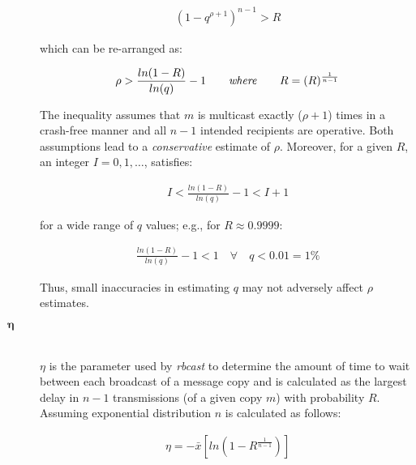 \begin{description}
		\begin{equation*}
		    \begin{aligned}
		        (1-q^{\rho+1})^{n-1} > R
		    \end{aligned}
		\end{equation*}

        which can be re-arranged as:

        \begin{equation*}
		    \begin{aligned}
		        \rho > \frac{ln(1-R)}{ln(q)} -1 \qquad \mbox{\emph{where}} \qquad R=(R)^{\frac{1}{n-1}}
		    \end{aligned}
		\end{equation*}

        The inequality assumes that $m$ is multicast exactly ($\rho +1$) times in a crash-free manner and all $n-1$  intended recipients are operative. Both assumptions lead to a \emph{conservative} estimate of $\rho$. Moreover, for a given $R$, an integer $I =0,1, \ldots$, satisfies: 

        \begin{equation*}
		    \begin{aligned}
		        I < \frac{ln(1-R)}{ln(q)}-1 < I+1
		    \end{aligned}
		\end{equation*}
		
        for a wide range of $q$ values; e.g., for $R \approx 0.9999$:

        \begin{equation*}
		    \begin{aligned}
                \frac{ln(1-R)}{ln(q)}-1 < 1 \quad \forall \quad q < 0.01 = 1\%
		    \end{aligned}
		\end{equation*}

        Thus, small inaccuracies in estimating $q$ may not adversely affect $\rho$ estimates.

        \item[\Huge$\boldsymbol{\eta}$] \hfill \\
        $\eta$ is the parameter used by \emph{rbcast} to determine the amount of time to wait between each broadcast of a message copy and is calculated as the largest delay in $n - 1$ transmissions (of a given copy $m$) with probability $R$.  Assuming exponential distribution $n$ is calculated as follows:
        
        \begin{equation*}
		    \begin{aligned}
		        \eta=-\bar{x}[ln(1-R^{\frac{1}{n-1}})]  
		    \end{aligned}
		\end{equation*}
		

\end{description}
